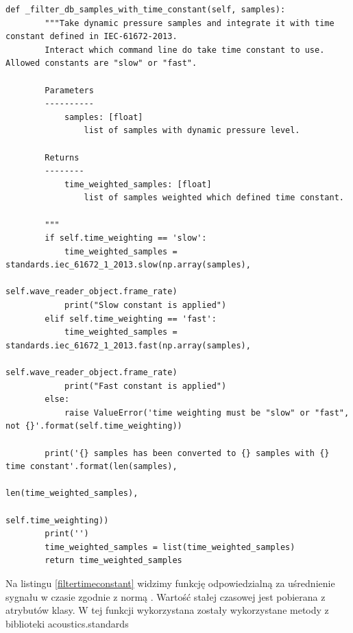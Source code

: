 \documentclass[eng,printmode]{mgr}
\begin{document}
\begin{minipage}{\linewidth}
\begin{lstlisting}[caption={fragment kodu źródłowego pliku SampledBConverter.py, klasa SamplesDbSPLConverter, metoda \_filte\_db\_samples\_with\_time\_constant},captionpos=b,label={filtertimeconstant}]
    def _filter_db_samples_with_time_constant(self, samples):
        """Take dynamic pressure samples and integrate it with time constant defined in IEC-61672-2013.
        Interact which command line do take time constant to use. Allowed constants are "slow" or "fast".

        Parameters
        ----------
            samples: [float]
                list of samples with dynamic pressure level.

        Returns
        --------
            time_weighted_samples: [float]
                list of samples weighted which defined time constant.

        """
        if self.time_weighting == 'slow':
            time_weighted_samples = standards.iec_61672_1_2013.slow(np.array(samples),
                                                                    self.wave_reader_object.frame_rate)
            print("Slow constant is applied")
        elif self.time_weighting == 'fast':
            time_weighted_samples = standards.iec_61672_1_2013.fast(np.array(samples),
                                                                    self.wave_reader_object.frame_rate)
            print("Fast constant is applied")
        else:
            raise ValueError('time weighting must be "slow" or "fast", not {}'.format(self.time_weighting))

        print('{} samples has been converted to {} samples with {} time constant'.format(len(samples),
                                                                            len(time_weighted_samples),
                                                                                   self.time_weighting))
        print('')
        time_weighted_samples = list(time_weighted_samples)
        return time_weighted_samples
\end{lstlisting}
\end{minipage}

Na listingu \ref{filtertimeconstant} widzimy funkcję odpowiedzialną za uśrednienie sygnału w czasie zgodnie z normą \cite{IEC-61672-2013}. Wartość stałej czasowej jest pobierana z atrybutów klasy. W tej funkcji wykorzystana zostały wykorzystane metody z biblioteki acoustics.standards \cite{acoustics}
\end{document}
